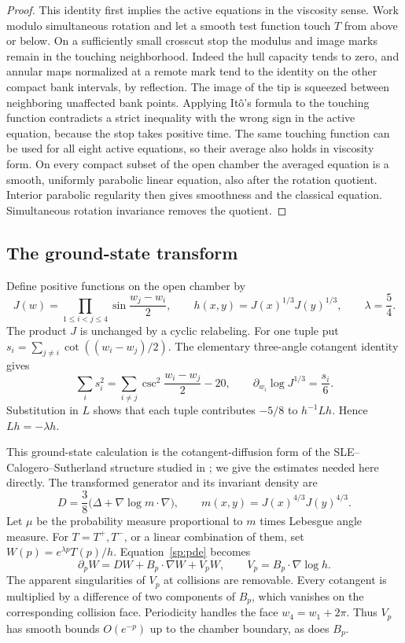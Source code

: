 \begin{proof}
This identity first implies the active equations in the viscosity
sense.  Work modulo simultaneous rotation and let a smooth test
function touch $T$ from above or below.  On a sufficiently small
crosscut stop the modulus and image marks remain in the touching
neighborhood.  Indeed the hull capacity tends to zero, and annular
maps normalized at a remote mark tend to the identity on the other
compact bank intervals, by reflection.  The image of the tip is
squeezed between neighboring unaffected bank points.  Applying It\^o's
formula to the touching function contradicts a strict inequality with
the wrong sign in the active equation, because the stop takes positive
time.  The same touching function can be used for all eight active
equations, so their average also holds in viscosity form.  On every
compact subset of the open chamber the averaged equation is a smooth,
uniformly parabolic linear equation, also after the rotation quotient.
Interior parabolic regularity then gives smoothness and the classical
equation.  Simultaneous rotation invariance removes the quotient.
\end{proof}

\subsection{The ground-state transform}

Define positive functions on the open chamber by
\begin{equation}\label{sp:ground-state}
 J(w)=\prod_{1\le i<j\le4}\sin\frac{w_j-w_i}{2},\qquad
 h(x,y)=J(x)^{1/3}J(y)^{1/3},\qquad \lambda=\frac54.
\end{equation}
The product $J$ is unchanged by a cyclic relabeling.  For one tuple put
$s_i=\sum_{j\ne i}\cot((w_i-w_j)/2)$.  The elementary three-angle
cotangent identity gives
\[
 \sum_i s_i^2=\sum_{i\ne j}\csc^2\frac{w_i-w_j}{2}-20,
 \qquad \partial_{w_i}\log J^{1/3}=\frac{s_i}{6}.
\]
Substitution in $L$ shows that each tuple contributes $-5/8$ to
$h^{-1}Lh$.  Hence $Lh=-\lambda h$.

This ground-state calculation is the cotangent-diffusion form of the
SLE--Calogero--Sutherland structure studied in \cite{CardyCS}; we give
the estimates needed here directly.  The transformed generator and
its invariant density are
\begin{equation}\label{sp:doob-generator}
 D=\frac38\bigl(\Delta+\nabla\log m\cdot\nabla\bigr),
 \qquad m(x,y)=J(x)^{4/3}J(y)^{4/3}.
\end{equation}
Let $\mu$ be the probability measure proportional to $m$ times Lebesgue
angle measure.  For $T=T^+,T^-$, or a linear combination of them, set
$W(p)=e^{\lambda p}T(p)/h$.  Equation~\eqref{sp:pde} becomes
\begin{equation}\label{sp:transformed-pde}
 \partial_pW=DW+B_p\cdot\nabla W+V_pW,
 \qquad V_p=B_p\cdot\nabla\log h.
\end{equation}
The apparent singularities of $V_p$ at collisions are removable.
Every cotangent is multiplied by a difference of two components of
$B_p$, which vanishes on the corresponding collision face.
Periodicity handles the face $w_4=w_1+2\pi$.  Thus $V_p$ has smooth
bounds $O(e^{-p})$ up to the chamber boundary, as does $B_p$.

